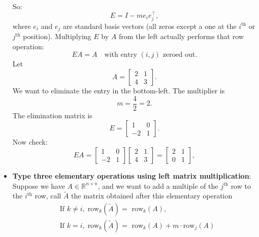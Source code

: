 \documentclass{report}
\begin{document}
\begin{itemize}
            So:
            \[
                E = I - m e_i e_j^{\top},
            \]
            where $e_i$ and $e_j$ are standard basis vectors (all zeros except a one at the $i^{\text{th}}$ or $j^{\text{th}} $ position).
            \bigbreak \noindent 
            Multiplying $E$ by $A$ from the left actually performs that row operation:
            \[
                EA = A \quad \text{with entry $(i,j)$ zeroed out.}
            \]
            Let
            \[
                A = \begin{bmatrix}
                    2 & 1 \\
                    4 & 3
                \end{bmatrix}.
            \]
            We want to eliminate the entry in the bottom-left.  
            \bigbreak \noindent 
            The multiplier is
            \[
                m = \frac{4}{2} = 2.
            \]
            The elimination matrix is
            \[
                E = \begin{bmatrix}
                    1 & 0 \\
                    -2 & 1
                \end{bmatrix}.
            \]
            Now check:
            \[
                EA =
                \begin{bmatrix}
                    1 & 0 \\
                    -2 & 1
                \end{bmatrix}
                \begin{bmatrix}
                    2 & 1 \\
                    4 & 3
                \end{bmatrix}
                =
                \begin{bmatrix}
                    2 & 1 \\
                    0 & 1
                \end{bmatrix},
            \]
        \item \textbf{Type three elementary operations using left matrix multiplication}: Suppose we have $A \in \mathbb{R}^{n\times n}$, and we want to add a multiple of the $j^{\text{th}}$ row to the $i^{\text{th}}$ row, call $\tilde{A}$ the matrix obtained after this elementary operation
            \begin{align*}
                &\text{If } k \ne i,\; \text{row}_{k}(\tilde{A}) = \text{ row}_{k}(A), \\ 
                &\text{If } k = i,\; \text{row}_{k}(\tilde{A}) = \text{ row}_{k}(A) + m\cdot \text{row}_{j}(A)

\end{align*}
\end{itemize}
\end{document}
